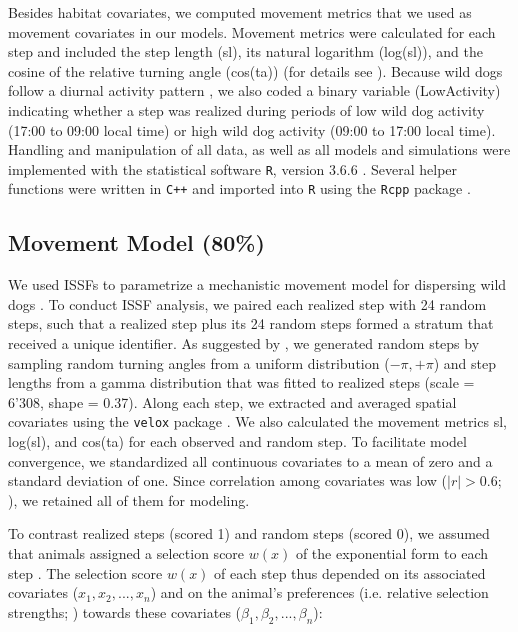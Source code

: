 \documentclass[abstract=on,10pt,a4paper,bibliography=totocnumbered]{article}
\begin{document}
Besides habitat covariates, we computed movement metrics that we used as
movement covariates in our models. Movement metrics were calculated for each
step and included the step length (\textsf{sl}), its natural logarithm
(\textsf{log(sl)}), and the cosine of the relative turning angle
(\textsf{cos(ta)}) (for details see \citep{Avgar.2016, Fieberg.2020}). Because
wild dogs follow a diurnal activity pattern \citep{Castello.2018}, we also coded
a binary variable (\textsf{LowActivity}) indicating whether a step was realized
during periods of low wild dog activity (17:00 to 09:00 local time) or high wild
dog activity (09:00 to 17:00 local time). Handling and manipulation of all data,
as well as all models and simulations were implemented with the statistical
software {\tt R}, version 3.6.6 \citep{R.2019}. Several helper functions were
written in {\tt C++} and imported into {\tt R} using the {\tt Rcpp} package
\citep{Eddelbuettel.2011, Eddelbuettel.2013}.

\subsection{Movement Model (80\%)}
We used ISSFs to parametrize a mechanistic movement model for dispersing wild
dogs \citep{Avgar.2016}. To conduct ISSF analysis, we paired each realized step
with 24 random steps, such that a realized step plus its 24 random steps formed
a stratum that received a unique identifier. As suggested by \cite{Avgar.2016},
we generated random steps by sampling random turning angles from a uniform
distribution (\(-\pi, +\pi\)) and step lengths from a gamma distribution that
was fitted to realized steps (scale = 6'308, shape = 0.37). Along each step, we
extracted and averaged spatial covariates using the {\tt velox} package
\citep{Hunziker.2021}. We also calculated the movement metrics \textsf{sl},
\textsf{log(sl)}, and \textsf{cos(ta)} for each observed and random step. To
facilitate model convergence, we standardized all continuous covariates to a
mean of zero and a standard deviation of one. Since correlation among covariates
was low (\(|r| > 0.6\); \citealp{Latham.2011}), we retained all of them for
modeling.

To contrast realized steps (scored 1) and random steps (scored 0), we assumed
that animals assigned a selection score \(w(x)\) of the exponential form to each
step \citep{Fortin.2005}. The selection score \(w(x)\) of each step thus
depended on its associated covariates (\(x_1, x_2, ..., x_n\)) and on the
animal's preferences (i.e. relative selection strengths; \citealp{Avgar.2017})
towards these covariates (\(\beta_1, \beta_2, ..., \beta_n\)):
\end{document}
